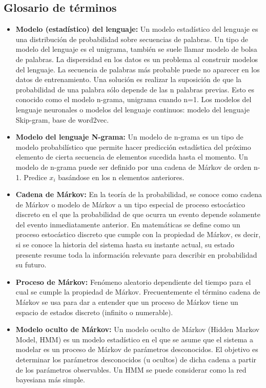\documentclass[spanish,12pt, a4paper,twoside]{paper}
\begin{document}
\subsection*{Glosario de términos}
\begin{itemize}
	\item \textbf{Modelo (estadístico) del lenguaje:} Un modelo estadístico del lenguaje es una distribución de probabilidad sobre secuencias de palabras. Un tipo de modelo del lenguaje es el unigrama, también se suele llamar modelo de bolsa de palabras. La dispersidad en los datos es un problema al construir modelos del lenguaje. La secuencia de palabras más probable puede no aparecer en los datos de entrenamiento. Una solución es realizar la suposición de que la probabilidad de una palabra sólo depende de las n palabras previas. Esto es conocido como el modelo n-grama, unigrama cuando n=1. Los modelos del lenguaje neuronales o modelos del lenguaje continuos: modelo del lenguaje Skip-gram, base de word2vec.
	\item \textbf{Modelo del lenguaje N-grama:} Un modelo de n-grama es un tipo de modelo probabilístico que permite hacer predicción estadística del próximo elemento de cierta secuencia de elementos sucedida hasta el momento. Un modelo de n-grama puede ser definido por una cadena de Márkov de orden n-1. Predice $x_i$ basándose en los n elementos anteriores. 
	\item \textbf{Cadena de Márkov:} En la teoría de la probabilidad, se conoce como cadena de Márkov o modelo de Márkov a un tipo especial de proceso estocástico discreto en el que la probabilidad de que ocurra un evento depende solamente del evento inmediatamente anterior. En matemáticas se define como un proceso estocástico discreto que cumple con la propiedad de Márkov, es decir, si se conoce la historia del sistema hasta su instante actual, su estado presente resume toda la información relevante para describir en probabilidad su futuro.
	\item \textbf{Proceso de Márkov:} Fenómeno aleatorio dependiente del tiempo para el cual se cumple la propiedad de Márkov. Frecuentemente el término cadena de Márkov se usa para dar a entender que un proceso de Márkov tiene un espacio de estados discreto (infinito o numerable).
	\item \textbf{Modelo oculto de Márkov:} Un modelo oculto de Márkov (Hidden Markov Model, HMM) es un modelo estadístico en el que se asume que el sistema a modelar es un proceso de Márkov de parámetros desconocidos. El objetivo es determinar los parámetros desconocidos (u ocultos) de dicha cadena a partir de los parámetros observables. Un HMM se puede considerar como la red bayesiana más simple. 

\end{itemize}
\end{document}
